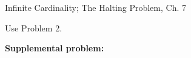 \documentclass[handout]{mcs}
\begin{document}

\begin{staffnotes}
Infinite Cardinality; The Halting Problem, Ch. 7
\end{staffnotes}

\hint Use Problem 2.


\textbf{Supplemental problem:}




\end{document}
